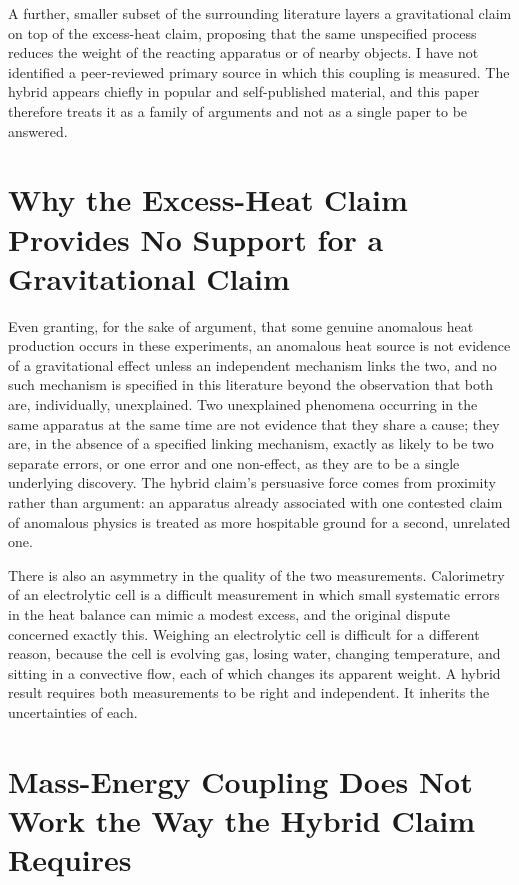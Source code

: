 \documentclass[11pt]{article}
\begin{document}
A further, smaller subset of the surrounding literature layers a gravitational claim on top of the excess-heat claim, proposing that the same unspecified process reduces the weight of the reacting apparatus or of nearby objects. I have not identified a peer-reviewed primary source in which this coupling is measured. The hybrid appears chiefly in popular and self-published material, and this paper therefore treats it as a family of arguments and not as a single paper to be answered.

\section{Why the Excess-Heat Claim Provides No Support for a Gravitational Claim}

Even granting, for the sake of argument, that some genuine anomalous heat production occurs in these experiments, an anomalous heat source is not evidence of a gravitational effect unless an independent mechanism links the two, and no such mechanism is specified in this literature beyond the observation that both are, individually, unexplained. Two unexplained phenomena occurring in the same apparatus at the same time are not evidence that they share a cause; they are, in the absence of a specified linking mechanism, exactly as likely to be two separate errors, or one error and one non-effect, as they are to be a single underlying discovery. The hybrid claim's persuasive force comes from proximity rather than argument: an apparatus already associated with one contested claim of anomalous physics is treated as more hospitable ground for a second, unrelated one.

There is also an asymmetry in the quality of the two measurements. Calorimetry of an electrolytic cell is a difficult measurement in which small systematic errors in the heat balance can mimic a modest excess, and the original dispute concerned exactly this. Weighing an electrolytic cell is difficult for a different reason, because the cell is evolving gas, losing water, changing temperature, and sitting in a convective flow, each of which changes its apparent weight. A hybrid result requires both measurements to be right and independent. It inherits the uncertainties of each.

\section{Mass-Energy Coupling Does Not Work the Way the Hybrid Claim Requires}
\end{document}
